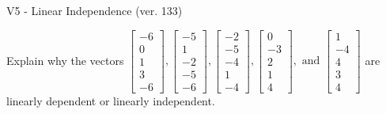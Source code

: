 \begin{exercise}
  \begin{exerciseTitle}V5 - Linear Independence (ver. 133)\end{exerciseTitle}
  \begin{exerciseStatement}
    Explain why the vectors \(\left[\begin{array}{r}
-6 \\
0 \\
1 \\
3 \\
-6
\end{array}\right] , \left[\begin{array}{r}
-5 \\
1 \\
-2 \\
-5 \\
-6
\end{array}\right] , \left[\begin{array}{r}
-2 \\
-5 \\
-4 \\
1 \\
-4
\end{array}\right] , \left[\begin{array}{r}
0 \\
-3 \\
2 \\
1 \\
4
\end{array}\right] , \text{ and } \left[\begin{array}{r}
1 \\
-4 \\
4 \\
3 \\
4
\end{array}\right]\) are linearly dependent or linearly independent.	



\end{exerciseStatement}
\end{exercise}
